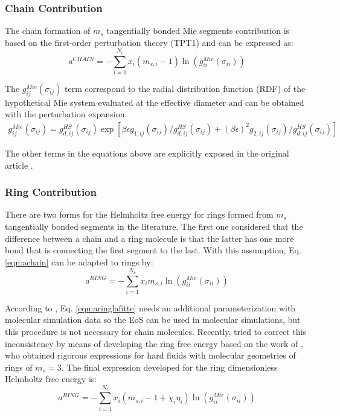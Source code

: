 \subsubsection{Chain Contribution}
The chain formation of $m_{s}$ tangentially bonded Mie segments contribution is based on the first-order perturbation theory (TPT1)  \cite{papa2014} and can be expressed as:
\begin{equation}
a^{CHAIN} =-\sum_{i=1}^{N_{c}} x_{i}(m_{s,i} - 1)\ln(g_{ii}^{Mie}(\sigma_{ii}))
\label{eqn:achain}
\end{equation}


The $g_{ij}^{Mie}(\sigma_{ij})$ term correspond to the radial distribution function (RDF) of the hypothetical Mie system evaluated at the effective diameter and can be obtained with the perturbation expansion:
\begin{equation}
\begin{aligned}
g_{ij}^{Mie}(\sigma_{ij}) =g_{d,ij}^{HS}(\sigma_{ij})\exp[\beta\epsilon g_{1,ij}(\sigma_{ij})/g_{d,ij}^{HS}(\sigma_{ij}) + (\beta\epsilon)^{2} g_{2,ij}(\sigma_{ij})/g_{d,ij}^{HS}(\sigma_{ij})]
\end{aligned}
\label{eqn:gmie}
\end{equation}


The other terms in the equations above are explicitly exposed in the original article \cite{lafitte2013}. 

\subsubsection{Ring Contribution}
There are two forms for the Helmholtz free energy for rings formed from $m_{s}$ tangentially bonded segments in the literature. The first one  \cite{lafitte2012} considered that the difference between a chain and a ring molecule is that the latter has one more bond that is connecting the first segment to the last. With this assumption, Eq. \eqref{eqn:achain} can be adapted to rings by:
\begin{equation}
a^{RING} =-\sum_{i=1}^{N_{c}} x_{i}m_{s,i}\ln(g_{ii}^{Mie}(\sigma_{ii}))
\label{eqn:aringlafitte}
\end{equation}

According to , Eq. \eqref{eqn:aringlafitte} needs an additional parameterization with molecular simulation data so the EoS can  be used in molecular simulations, but this procedure is not necessary for chain molecules. Recently,  tried to correct this inconsistency by means of developing the ring free energy based on the work of , who obtained rigorous expressions for hard fluids with molecular geometries of rings of $m_s=3$. The final expression developed for the ring dimensionless Helmholtz free energy is:
\begin{equation}
a^{RING} =-\sum_{i=1}^{N_{c}} x_{i}(m_{s,i}-1+\chi_{i}\eta_{i})\ln(g_{ii}^{Mie}(\sigma_{ii}))
\label{eqn:aringmuller}
\end{equation}

